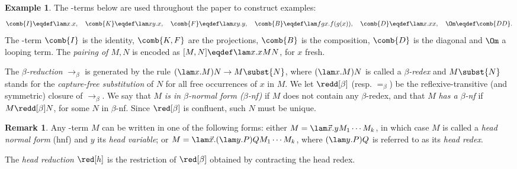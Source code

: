 \documentclass[10pt,a4paper]{amsart}
\theoremstyle{definition}
\newtheorem{example}[theorem]{Example}
\newtheorem{remark}[theorem]{Remark}
\providecommand{\todo}[2][]{}
\newcommand{\comasi}[1]	{\todo[color=cyan,inline]	{Alex: #1}}
\begin{document}
\begin{example}\label{ex:combinators}
The \lam-terms below are used throughout the paper to construct examples:
\[
	\comb{I} \eqdef \lam x.x,\quad 
	 \comb{K} \eqdef \lam xy.x,\quad 
	 \comb{F} \eqdef \lam xy.y,\quad 
	 \comb{B} \eqdef \lam fgx.f(g(x)),\quad
 	 \comb{D} \eqdef \lam x.xx,\quad
	 \Om \eqdef \comb{DD}.
\]
The \lam-term $\comb{I}$ is the identity, $\comb{K,F}$ are the projections, $\comb{B}$ is the composition, $\comb{D}$ is the diagonal and $\Om$ a looping term.
The \emph{pairing of $M,N$} is encoded as $[M,N] \eqdef \lam x.xMN$, for $x$ fresh. 
\end{example}
The \emph{$\beta$-reduction} $\to_\beta$ is generated by the rule
$
	(\lam x.M)N\to M\subst{N}
$, where $(\lam x.M)N$ is called a \emph{$\beta$-redex} and $M\subst{N}$ stands for the \emph{capture-free substitution} of $N$ for all free occurrences of $x$ in $M$. 
We let $\redd[\beta]$ (resp. $=_\beta$) be the reflexive-transitive (and symmetric) closure of $\to_\beta$.
We say that $M$ \emph{is in $\beta$-normal form ($\beta$-nf)} if $M$ does not contain any $\beta$-redex, and that $M$ \emph{has a $\beta$-nf} if $M\redd[\beta] N$, for some $N$ in $\beta$-nf.
Since $\red[\beta]$ is confluent, such $N$ must be unique.

\begin{remark}\label{rem:hnfs}
Any \lam-term $M$ can be written in one of the following forms: either $M = \lam\vec{x}.yM_1\cdots M_k$, in which case $M$ is called a \emph{head normal form} (hnf) and $y$ its \emph{head variable}; or $M = \lam\vec{x}.(\lam y.P)QM_1\cdots M_k$, where $(\lam y.P)Q$ is referred to as its \emph{head redex}.
\end{remark}
The \emph{head reduction} $\red[h]$ is the restriction of $\red[\beta]$ obtained by contracting the head redex.
\end{document}
